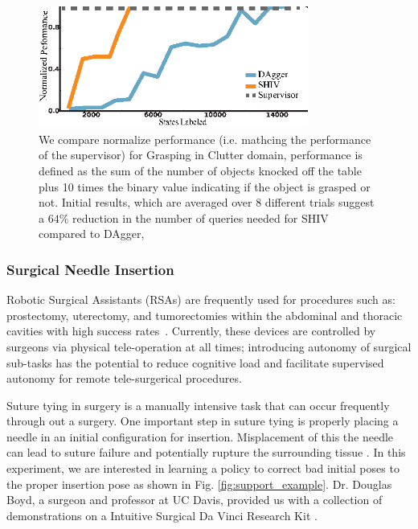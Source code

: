 \documentclass[10pt, conference]{ieeeconf}      %
\begin{document}
\begin{figure}[t!]
\centering
\includegraphics[width=\columnwidth, height=4cm]{figures/grasp_clutter.eps}
\caption{We compare normalize performance (i.e. mathcing the performance of the supervisor) for Grasping in Clutter domain, performance is defined as the sum of the number of objects knocked off the table plus 10 times the binary value indicating if the object is grasped or not. Initial results, which are averaged over 8 different trials suggest a $64\%$ reduction in the number of queries needed for SHIV compared to DAgger,}
\vspace*{-10pt}
\label{fig:grasp_cost}
\end{figure}




\subsubsection{Surgical Needle Insertion}

Robotic Surgical Assistants (RSAs) are frequently used for procedures such as: prostectomy, uterectomy, and tumorectomies within the abdominal and thoracic cavities with high success rates~\cite{van2013laparoscopic,darzi2004impact}. Currently, these devices are controlled by surgeons via physical tele-operation at all times; introducing autonomy of surgical sub-tasks has the potential to reduce cognitive load and facilitate supervised autonomy for remote tele-surgerical procedures.

Suture tying in surgery is a manually intensive task that can occur frequently through out a surgery. One important step
in suture tying is properly placing a needle in an initial configuration for insertion. Misplacement of this the needle
can lead to suture failure and potentially rupture the surrounding tissue \cite{liu2015optimal}. In this experiment, we
are interested in learning a policy to correct bad initial poses to the proper insertion pose as shown in Fig.
\ref{fig:support_example}. Dr. Douglas Boyd, a surgeon and professor at UC Davis, provided us with a collection of demonstrations on a Intuitive Surgical Da Vinci Research Kit \cite{AnnualReport2014}.
\end{document}

